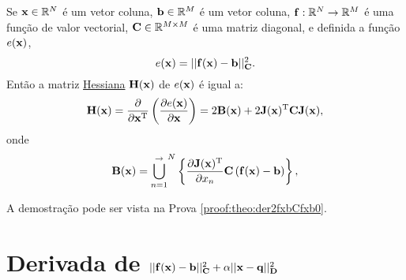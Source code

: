 \begin{theorem}\label{theo:der2fxbCfxb0}
Se 
$\VECTOR{x}\in \mathbb{R}^N$ é um vetor coluna, 
$\VECTOR{b}\in \mathbb{R}^M$ é um vetor coluna,  
$\VECTOR{f}: \mathbb{R}^{N}\rightarrow \mathbb{R}^{M}$ é uma função de valor vectorial,
$\MATRIX{C} \in \mathbb{R}^{M\times M}$ é uma matriz diagonal, e
definida a função $e(\VECTOR{x})$,
\begin{equation}
e(\VECTOR{x})= ||\VECTOR{f}(\VECTOR{x})-\VECTOR{b}||_{\MATRIX{C}}^2.
\end{equation}
Então a matriz \hyperref[def:hessian]{Hessiana} \cite{Hessian} $\MATRIX{H}(\VECTOR{x})$ de $e(\VECTOR{x})$ é igual a:
\begin{equation}
\MATRIX{H}(\VECTOR{x}) = \frac{\partial}{\partial \VECTOR{x}^{\transpose}}\left(  
\frac{\partial e(\VECTOR{x}) }{\partial \VECTOR{x}} \right) = 2 \MATRIX{B}(\VECTOR{x})
+2 \MATRIX{J}(\VECTOR{x})^{\transpose}\MATRIX{C} \MATRIX{J}(\VECTOR{x}),
\end{equation}
onde 
\begin{equation}
 \MATRIX{B}(\VECTOR{x})=
{\bigcup\limits_{n=1}^{ \rightarrow }}^{N}\left\{ \frac{\partial \MATRIX{J}(\VECTOR{x})^{\transpose} }{\partial x_{n}} \MATRIX{C} \left( \VECTOR{f}(\VECTOR{x})-\VECTOR{b}\right) \right\},
\end{equation}


A demostração pode ser vista na Prova \ref{proof:theo:der2fxbCfxb0}.
\end{theorem}



\section{Derivada de $||\VECTOR{f}(\VECTOR{x})-\VECTOR{b}||_{\MATRIX{C}}^2+\alpha||\VECTOR{x}-\VECTOR{q}||_{\MATRIX{D}}^2$ 
}

